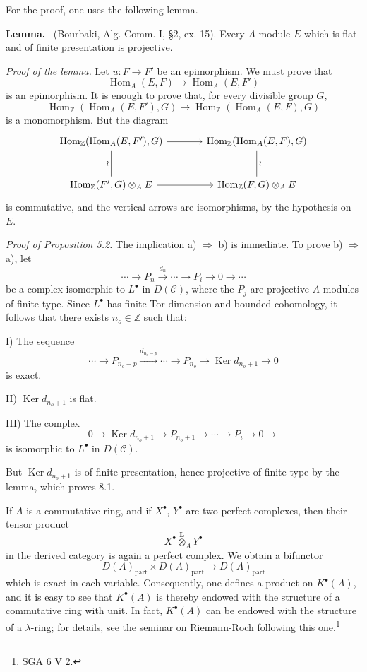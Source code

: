 \documentclass[11pt]{article}
\newenvironment{statement}[1]{\par\medskip\noindent\textbf{#1.}\ }{\par\medskip}
\DeclareMathOperator{\Hom}{Hom}
\providecommand{\Ker}{\operatorname{Ker}}
\providecommand{\parf}{\mathrm{parf}}
\providecommand{\Hom}{\operatorname{Hom}}
\providecommand{\cC}{\mathcal C}
\providecommand{\Ker}{\operatorname{Ker}}
\providecommand{\Ker}{\operatorname{Ker}}
\providecommand{\cC}{\mathcal C}
\providecommand{\parf}{\mathrm{parf}}
\providecommand{\Hom}{\operatorname{Hom}}
\begin{document}
For the proof, one uses the following lemma.

\begin{statement}{Lemma}
(Bourbaki, Alg. Comm. I, §2, ex. 15). Every $A$-module $E$ which is flat and of finite presentation is projective.
\end{statement}

\emph{Proof of the lemma.} Let $u:F\to F'$ be an epimorphism. We must prove that
\[
\Hom_A(E,F)\longrightarrow\Hom_A(E,F')
\]
is an epimorphism. It is enough to prove that, for every divisible group $G$,
\[
\Hom_{\mathbb Z}(\Hom_A(E,F'),G)\longrightarrow
\Hom_{\mathbb Z}(\Hom_A(E,F),G)
\]
is a monomorphism. But the diagram
\[
\begin{tikzcd}[column sep=large,row sep=large]
\Hom_{\mathbb Z}(\Hom_A(E,F'),G)
 \arrow[r]\arrow[d,dash,"\wr"']&
\Hom_{\mathbb Z}(\Hom_A(E,F),G)\arrow[d,dash,"\wr"]\\
\Hom_{\mathbb Z}(F',G)\otimes_A E
 \arrow[r]&
\Hom_{\mathbb Z}(F,G)\otimes_A E
\end{tikzcd}
\]
is commutative, and the vertical arrows are isomorphisms, by the hypothesis on $E$.

\emph{Proof of Proposition 5.2.} The implication a) $\Rightarrow$ b) is immediate. To prove b) $\Rightarrow$ a), let
\[
\cdots\longrightarrow P_n\xrightarrow{d_n}\cdots\longrightarrow P_i\longrightarrow 0\longrightarrow\cdots
\]
be a complex isomorphic to $L^\bullet$ in $D(\cC)$, where the $P_j$ are projective $A$-modules of finite type. Since $L^\bullet$ has finite Tor-dimension and bounded cohomology, it follows that there exists $n_o\in\mathbb Z$ such that:

I) The sequence
\[
\cdots\longrightarrow P_{n_o-p}\xrightarrow{d_{n_o-p}}\cdots\longrightarrow
P_{n_o}\longrightarrow \Ker d_{n_o+1}\longrightarrow0
\]
is exact.

II) $\Ker d_{n_o+1}$ is flat.

III) The complex
\[
0\longrightarrow \Ker d_{n_o+1}\longrightarrow P_{n_o+1}\longrightarrow\cdots\longrightarrow P_i\longrightarrow0\longrightarrow
\]
is isomorphic to $L^\bullet$ in $D(\cC)$.

But $\Ker d_{n_o+1}$ is of finite presentation, hence projective of finite type by the lemma, which proves 8.1.

If $A$ is a commutative ring, and if $X^\bullet$, $Y^\bullet$ are two perfect complexes, then their tensor product
\[
X^\bullet\overset{\mathbf L}{\otimes}_A Y^\bullet
\]
in the derived category is again a perfect complex. We obtain a bifunctor
\[
D(A)_{\parf}\times D(A)_{\parf}\longrightarrow D(A)_{\parf}
\]
which is exact in each variable. Consequently, one defines a product on $K^\bullet(A)$, and it is easy to see that $K^\bullet(A)$ is thereby endowed with the structure of a commutative ring with unit. In fact, $K^\bullet(A)$ can be endowed with the structure of a $\lambda$-ring; for details, see the seminar on Riemann-Roch following this one.\footnote{SGA 6 V 2.}
\end{document}
